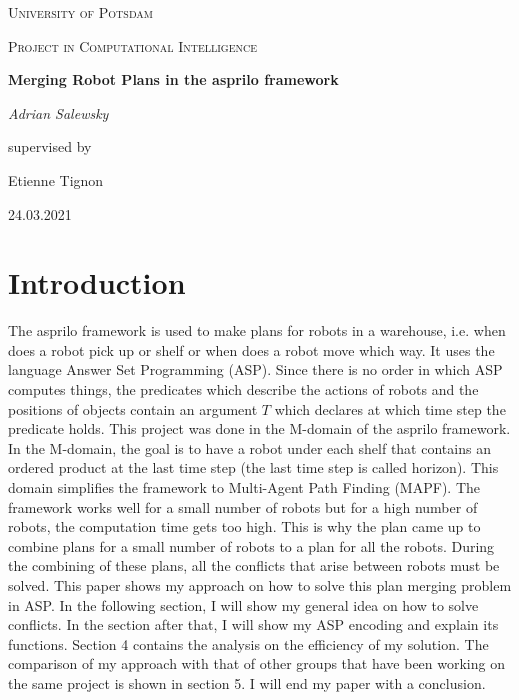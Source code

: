 \documentclass[runningheads]{llncs}
\begin{document}
\begin{titlepage}
\centering
{\scshape\LARGE University of Potsdam \par}
\vspace{1cm}
{\scshape\Large Project in Computational Intelligence\par}
\vspace{1.5cm}
{\huge\bfseries Merging Robot Plans in the asprilo framework\par}
\vspace{2cm}
{\Large\itshape Adrian Salewsky\par}
\vfill
supervised by\par
Etienne Tignon
\vfill
{24.03.2021 \par}


\begin{abstract}
The asprilo framework was created to make plans for robots in a warehouse. It uses the language Answer Set Programming
which is a good choice for such a problem because this language was made for solving NP-hard problems. The solution works 
well for a small number of robots but at some point the computation time gets too high. This is why the idea came up to create plans
for a small number of robots and then combine the plans to get a working solution. This paper shows my approach on how to solve
the plan merging problem.
\end{abstract}
\end{titlepage}


\section{Introduction}
The asprilo framework is used to make plans for robots in a warehouse, i.e. when does a robot pick up or shelf or when does a robot move which way. 
It uses the language Answer Set Programming (ASP). Since there is no order in which ASP computes things, the predicates which describe the actions of robots and
the positions of objects contain an argument $T$ which declares at which time step the predicate holds. This project was done in the M-domain of the asprilo framework.
In the M-domain, the goal is to have a robot under each shelf that contains an ordered product at the last time step (the last time step is called horizon). This domain simplifies the framework 
to Multi-Agent Path Finding (MAPF). The framework works well for a small number of robots but for a high number of robots, the computation time gets too high. This is
why the plan came up to combine plans for a small number of robots to a plan for all the robots. During the combining of these plans, all the conflicts that arise between 
robots must be solved. This paper shows my approach on how to solve this plan merging problem in ASP. In the following section, I will show my general idea on how to solve 
conflicts. In the section after that, I will show my ASP encoding and explain its functions. Section 4 contains the analysis on the efficiency of my solution. The comparison of my approach with that of other groups that have
been working on the same project is shown in section 5. I will end my paper with a conclusion. 
\end{document}

